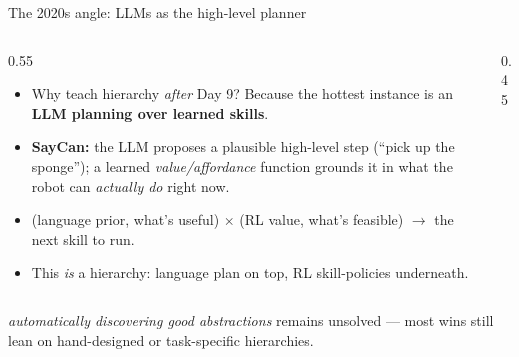 \begin{frame}{The 2020s angle: LLMs as the high-level planner}
\begin{columns}[c]
\begin{column}{0.55\textwidth}
\begin{itemize}\footnotesize\itemsep0.5em
    \item Why teach hierarchy \emph{after} Day 9? Because the hottest instance is an
          \textbf{LLM planning over learned skills}.
    \item \textbf{SayCan:} the LLM proposes a plausible high-level step (``pick up the
          sponge''); a learned \emph{value/affordance} function grounds it in what the
          robot can \emph{actually do} right now.
    \item {} (language prior, what's useful) $\times$  (RL value, what's
          feasible) $\rightarrow$ the next skill to run.
    \item This \emph{is} a hierarchy: language plan on top, RL skill-policies underneath.
\end{itemize}
\end{column}
\begin{column}{0.45\textwidth}
\centering
{}
\end{column}
\end{columns}
\vfill
\begin{center}\footnotesize
{} \emph{automatically discovering good abstractions} remains unsolved ---
most wins still lean on hand-designed or task-specific hierarchies.
\end{center}
\end{frame}
